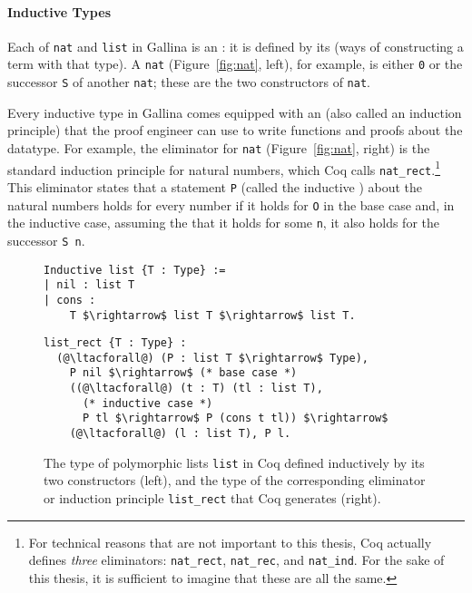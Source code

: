 \paragraph{Inductive Types}

Each of \lstinline{nat} and \lstinline{list} in Gallina is an :
it is defined by its  (ways of constructing a term with that type).
A \lstinline{nat} (Figure~\ref{fig:nat}, left), for example,
is either \lstinline{0} or the successor \lstinline{S} of another \lstinline{nat};
these are the two constructors of \lstinline{nat}.

Every inductive type in Gallina comes equipped with an  (also called an induction principle)
that the proof engineer can use to write functions and proofs about the datatype.
For example, the eliminator for \lstinline{nat} (Figure~\ref{fig:nat}, right) is the standard induction principle for natural numbers,
which Coq calls \lstinline{nat_rect}.\footnote{For technical reasons that are not important to this thesis,
Coq actually defines \textit{three} eliminators: \lstinline{nat_rect}, \lstinline{nat_rec}, and \lstinline{nat_ind}.
For the sake of this thesis, it is sufficient to imagine that these are all the same.}
This eliminator states that a statement \lstinline{P} (called the inductive ) about the natural numbers
holds for every number if it holds for \lstinline{O} in the base case and, in the inductive case,
assuming the  that it holds for some \lstinline{n}, it also holds for the successor \lstinline{S n}.

\begin{figure}
\begin{minipage}{0.44\textwidth}
\begin{lstlisting}
Inductive list {T : Type} :=
| nil : list T
| cons :
    T $\rightarrow$ list T $\rightarrow$ list T.
\end{lstlisting}
\end{minipage}
\hfill
\begin{minipage}{0.55\textwidth}
\begin{lstlisting}
list_rect {T : Type} :
  (@\ltacforall@) (P : list T $\rightarrow$ Type),
    P nil $\rightarrow$ (* base case *)
    ((@\ltacforall@) (t : T) (tl : list T),
      (* inductive case *)
      P tl $\rightarrow$ P (cons t tl)) $\rightarrow$
    (@\ltacforall@) (l : list T), P l.
\end{lstlisting}
\end{minipage}
\caption{The type of polymorphic lists \lstinline{list} in Coq defined inductively by its two constructors (left), and the type of the corresponding eliminator or induction principle \lstinline{list_rect} that Coq generates (right).}
\label{fig:list}
\end{figure}

